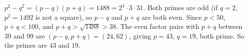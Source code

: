 $p^2-q^2=(p-q)(p+q)=1488=2^4\cdot3\cdot31$. Both primes are odd (if $q=2$, $p^2=1492$ is not a square), so $p-q$ and $p+q$ are both even. Since $p<50$, $p+q<100$, and $p+q>\sqrt{1488}>38$. The even factor pairs with $p+q$ between $39$ and $99$ are $(p-q,p+q)=(24,62)$, giving $p=43$, $q=19$, both prime. So the primes are $\boxed{43\text{ and }19}$.
